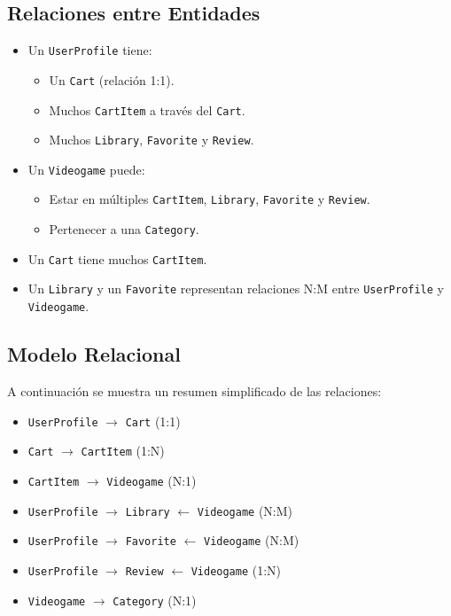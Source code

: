 \documentclass{article}
\begin{document}
\subsection{Relaciones entre Entidades}

\begin{itemize}
  \item Un \texttt{UserProfile} tiene:
  \begin{itemize}
    \item Un \texttt{Cart} (relación 1:1).
    \item Muchos \texttt{CartItem} a través del \texttt{Cart}.
    \item Muchos \texttt{Library}, \texttt{Favorite} y \texttt{Review}.
  \end{itemize}
  
  \item Un \texttt{Videogame} puede:
  \begin{itemize}
    \item Estar en múltiples \texttt{CartItem}, \texttt{Library}, \texttt{Favorite} y \texttt{Review}.
    \item Pertenecer a una \texttt{Category}.
  \end{itemize}
  
  \item Un \texttt{Cart} tiene muchos \texttt{CartItem}.
  
  \item Un \texttt{Library} y un \texttt{Favorite} representan relaciones N:M entre \texttt{UserProfile} y \texttt{Videogame}.
\end{itemize}

\subsection{Modelo Relacional}

A continuación se muestra un resumen simplificado de las relaciones:

\begin{itemize}
  \item \texttt{UserProfile} $\longrightarrow$ \texttt{Cart} (1:1)
  \item \texttt{Cart} $\longrightarrow$ \texttt{CartItem} (1:N)
  \item \texttt{CartItem} $\longrightarrow$ \texttt{Videogame} (N:1)
  \item \texttt{UserProfile} $\longrightarrow$ \texttt{Library} $\longleftarrow$ \texttt{Videogame} (N:M)
  \item \texttt{UserProfile} $\longrightarrow$ \texttt{Favorite} $\longleftarrow$ \texttt{Videogame} (N:M)
  \item \texttt{UserProfile} $\longrightarrow$ \texttt{Review} $\longleftarrow$ \texttt{Videogame} (1:N)
  \item \texttt{Videogame} $\longrightarrow$ \texttt{Category} (N:1)
\end{itemize}
\end{document}
